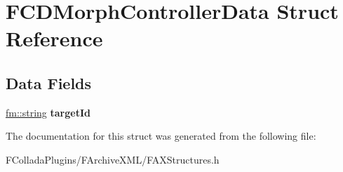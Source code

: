 \hypertarget{structFCDMorphControllerData}{
\section{FCDMorphControllerData Struct Reference}
\label{structFCDMorphControllerData}
}
\subsection*{Data Fields}
\begin{DoxyCompactItemize}
\item 
\hypertarget{structFCDMorphControllerData_a178624878903024908ad4076488a8349}{
\hyperlink{classfm_1_1stringT}{fm::string} {\bfseries targetId}}
\label{structFCDMorphControllerData_a178624878903024908ad4076488a8349}

\end{DoxyCompactItemize}


The documentation for this struct was generated from the following file:\begin{DoxyCompactItemize}
\item 
FColladaPlugins/FArchiveXML/FAXStructures.h\end{DoxyCompactItemize}
